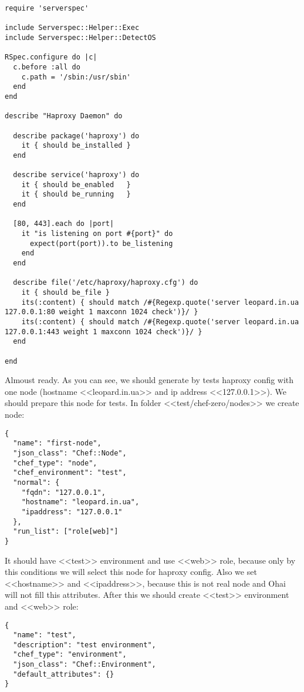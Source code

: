 \begin{lstlisting}[label=lst:testing-chef-zero19]
require 'serverspec'

include Serverspec::Helper::Exec
include Serverspec::Helper::DetectOS

RSpec.configure do |c|
  c.before :all do
    c.path = '/sbin:/usr/sbin'
  end
end

describe "Haproxy Daemon" do

  describe package('haproxy') do
    it { should be_installed }
  end

  describe service('haproxy') do
    it { should be_enabled   }
    it { should be_running   }
  end

  [80, 443].each do |port|
    it "is listening on port #{port}" do
      expect(port(port)).to be_listening
    end
  end

  describe file('/etc/haproxy/haproxy.cfg') do
    it { should be_file }
    its(:content) { should match /#{Regexp.quote('server leopard.in.ua 127.0.0.1:80 weight 1 maxconn 1024 check')}/ }
    its(:content) { should match /#{Regexp.quote('server leopard.in.ua 127.0.0.1:443 weight 1 maxconn 1024 check')}/ }
  end

end
\end{lstlisting}

Almoust ready. As you can see, we should generate by tests haproxy config with one node (hostname <<leopard.in.ua>> and ip address <<127.0.0.1>>). We should prepare this node for tests. In folder <<test/chef-zero/nodes>> we create node:

\begin{lstlisting}[label=lst:testing-chef-zero20]
{
  "name": "first-node",
  "json_class": "Chef::Node",
  "chef_type": "node",
  "chef_environment": "test",
  "normal": {
    "fqdn": "127.0.0.1",
    "hostname": "leopard.in.ua",
    "ipaddress": "127.0.0.1"
  },
  "run_list": ["role[web]"]
}
\end{lstlisting}

It should have <<test>> environment and use <<web>> role, because only by this conditions we will select this node for haproxy config. Also we set <<hostname>> and <<ipaddress>>, because this is not real node and Ohai will not fill this attributes. After this we should create <<test>> environment and <<web>> role:

\begin{lstlisting}[label=lst:testing-chef-zero21]
{
  "name": "test",
  "description": "test environment",
  "chef_type": "environment",
  "json_class": "Chef::Environment",
  "default_attributes": {}
}
\end{lstlisting}

